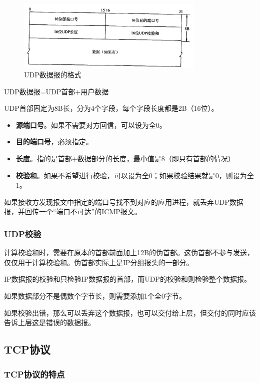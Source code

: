 \documentclass[12pt, a4paper, oneside]{ctexart}
\begin{document}
\begin{figure}[h]
    \centering
    \includegraphics[width=0.8\textwidth]{./images/udp_header.png}
    \caption{UDP数据报的格式}
\end{figure}

UDP数据报=UDP首部+用户数据

UDP首部固定为8B长，分为4个字段，每个字段长度都是2B（16位）。
\begin{itemize}
    \item {\bf 源端口号}。如果不需要对方回信，可以设为全0。
    \item {\bf 目的端口号}，必须指定。
    \item {\bf 长度}。指的是首部+数据部分的长度，最小值是8（即只有首部的情况）
    \item {\bf 校验和}。如果不希望进行校验，可以设为全0；如果校验结果就是0，则设为全1。
\end{itemize}

如果接收方发现报文中指定的端口号找不到对应的应用进程，就丢弃UDP数据报，并回传一个“端口不可达”的ICMP报文。

\subsubsection{UDP校验}

计算校验和时，需要在原本的首部前面加上12B的伪首部。这伪首部不参与发送，仅仅用于计算校验和。伪首部实际上是IP分组报头的一部分。

IP数据报的校验和只检验IP数据报的首部，而UDP的校验和则检验整个数据报。

如果数据部分不是偶数个字节长，则需要添加1个全0字节。

如果校验出错，那么可以丢弃这个数据报，也可以交付给上层，但交付的同时应该告诉上层这是错误的数据报。

\subsection{TCP协议}

\subsubsection{TCP协议的特点}
\end{document}
